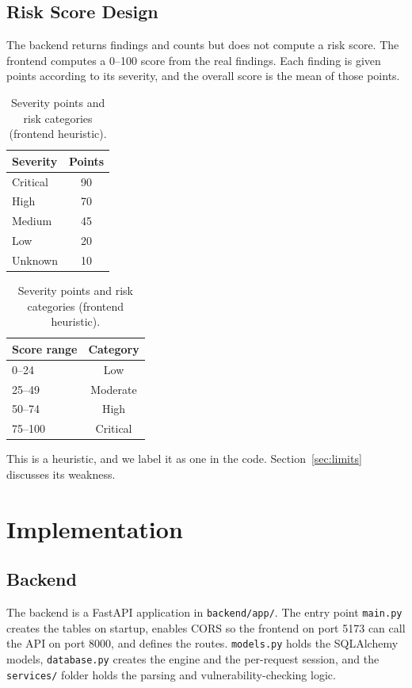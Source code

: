 \documentclass[12pt,a4paper]{report}
\begin{document}
\section{Risk Score Design}
The backend returns findings and counts but does not compute a risk score. The frontend computes a 0--100 score from the real findings. Each finding is given points according to its severity, and the overall score is the mean of those points.

\begin{table}[htbp]
\centering
\begin{tabular}{lc}
\toprule
\textbf{Severity} & \textbf{Points} \\
\midrule
Critical & 90 \\
High & 70 \\
Medium & 45 \\
Low & 20 \\
Unknown & 10 \\
\bottomrule
\end{tabular}
\qquad
\begin{tabular}{lc}
\toprule
\textbf{Score range} & \textbf{Category} \\
\midrule
0--24 & Low \\
25--49 & Moderate \\
50--74 & High \\
75--100 & Critical \\
\bottomrule
\end{tabular}
\caption{Severity points and risk categories (frontend heuristic).}
\end{table}

This is a heuristic, and we label it as one in the code. Section~\ref{sec:limits} discusses its weakness.

\chapter{Implementation}

\section{Backend}
The backend is a FastAPI application in \texttt{backend/app/}. The entry point \texttt{main.py} creates the tables on startup, enables CORS so the frontend on port 5173 can call the API on port 8000, and defines the routes. \texttt{models.py} holds the SQLAlchemy models, \texttt{database.py} creates the engine and the per-request session, and the \texttt{services/} folder holds the parsing and vulnerability-checking logic.
\end{document}
